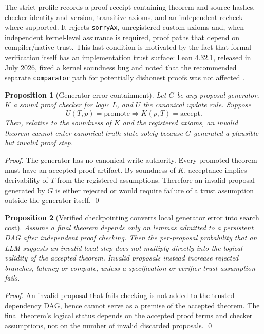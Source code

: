 \documentclass[11pt]{article}
\newtheorem{proposition}{Proposition}
\begin{document}
The strict profile records a proof receipt containing theorem and source hashes, checker identity and version, transitive axioms, and an independent recheck where supported. It rejects \texttt{sorryAx}, unregistered custom axioms and, when independent kernel-level assurance is required, proof paths that depend on compiler/native trust. This last condition is motivated by the fact that formal verification itself has an implementation trust surface: Lean 4.32.1, released in July 2026, fixed a kernel soundness bug and noted that the recommended separate \texttt{comparator} path for potentially dishonest proofs was not affected \cite{lean4321}.

\begin{proposition}[Generator-error containment]
Let $G$ be any proposal generator, $K$ a sound proof checker for logic $L$, and $U$ the canonical update rule. Suppose
\[
U(T,p)=\mathrm{promote}\Longrightarrow K(p,T)=\mathrm{accept}.
\]
Then, relative to the soundness of $K$ and the registered axioms, an invalid theorem cannot enter canonical truth state solely because $G$ generated a plausible but invalid proof step.
\end{proposition}

\begin{proof}
The generator has no canonical write authority. Every promoted theorem must have an accepted proof artifact. By soundness of $K$, acceptance implies derivability of $T$ from the registered assumptions. Therefore an invalid proposal generated by $G$ is either rejected or would require failure of a trust assumption outside the generator itself. \qed
\end{proof}

\begin{proposition}[Verified checkpointing converts local generator error into search cost]
Assume a final theorem depends only on lemmas admitted to a persistent DAG after independent proof checking. Then the per-proposal probability that an LLM suggests an invalid local step does not multiply directly into the logical validity of the accepted theorem. Invalid proposals instead increase rejected branches, latency or compute, unless a specification or verifier-trust assumption fails.
\end{proposition}

\begin{proof}
An invalid proposal that fails checking is not added to the trusted dependency DAG, hence cannot serve as a premise of the accepted theorem. The final theorem's logical status depends on the accepted proof terms and checker assumptions, not on the number of invalid discarded proposals. \qed
\end{proof}
\end{document}
